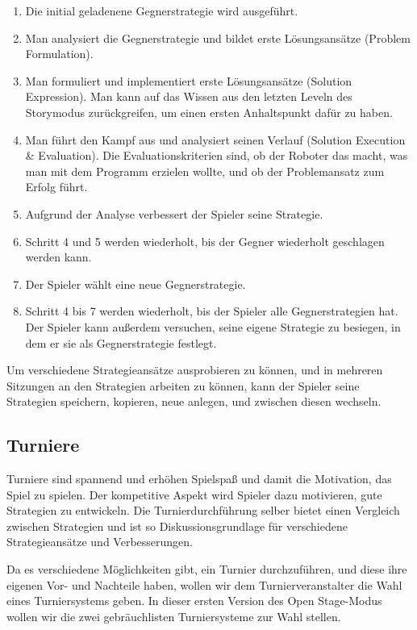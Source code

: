 \begin{enumerate}
\item Die initial geladenene Gegnerstrategie wird ausgeführt.
\item Man analysiert die Gegnerstrategie und bildet erste Lösungsansätze (Problem Formulation).
\item Man formuliert und implementiert erste Lösungsansätze (Solution Expression). Man kann auf das Wissen aus den letzten
Leveln des Storymodus zurückgreifen, um einen ersten Anhaltspunkt dafür zu haben.
\item Man führt den Kampf aus und analysiert seinen Verlauf (Solution Execution \& Evaluation). Die Evaluationskriterien sind, ob der Roboter
das macht, was man mit dem Programm erzielen wollte, und ob der Problemansatz zum Erfolg führt.
\item Aufgrund der Analyse verbessert der Spieler seine Strategie.
\item Schritt 4 und 5 werden wiederholt, bis der Gegner wiederholt geschlagen werden kann.
\item Der Spieler wählt eine neue Gegnerstrategie.
\item Schritt 4 bis 7 werden wiederholt, bis der Spieler alle Gegnerstrategien hat. Der Spieler kann außerdem
versuchen, seine eigene Strategie zu besiegen, in dem er sie als Gegnerstrategie festlegt.
\end{enumerate}

Um verschiedene Strategieansätze ausprobieren zu können, und in mehreren Sitzungen an den Strategien
arbeiten zu können, kann der Spieler seine Strategien speichern, kopieren, neue anlegen, und
zwischen diesen wechseln.


\subsection{Turniere}

Turniere sind spannend und erhöhen Spielspaß und damit die Motivation, das Spiel zu spielen. Der
kompetitive Aspekt wird Spieler dazu motivieren, gute Strategien zu entwickeln. Die
Turnierdurchführung selber bietet einen Vergleich zwischen Strategien und ist so
Diskussionsgrundlage für verschiedene Strategieansätze und Verbesserungen.

Da es verschiedene Möglichkeiten gibt, ein Turnier durchzuführen, und diese ihre eigenen Vor- und
Nachteile haben, wollen wir dem Turnierveranstalter die Wahl eines Turniersystems geben. In dieser
ersten Version des Open Stage-Modus wollen wir die zwei gebräuchlisten Turniersysteme zur Wahl
stellen.

